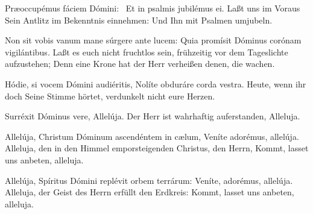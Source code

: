 \documentclass[fontsize=9pt,paper=A6,twoside,BCOR=1mm,DIV=22,headinclude]{scrarticle}
\begin{document}
\begin{paracol}{2}\pcb
	Præoccupémus fáciem Dómini:~\red{*} Et in psalmis jubilémus ei.
	\switchcolumn
	Laßt uns im Voraus Sein Antlitz im Bekenntnis einnehmen: \red{*} Und Ihn mit Psalmen umjubeln.
\end{paracol}

\begin{paracol}{2}\pcb
	Non sit vobis vanum mane súrgere ante lucem: \red{*} Quia promísit Dóminus corónam vigilántibus.
	\switchcolumn
	Laßt es euch nicht fruchtlos sein, frühzeitig vor dem Tageslichte aufzustehen; \red{*} Denn eine Krone hat der Herr verheißen denen, die wachen.
\end{paracol}

\begin{paracol}{2}\pcb
	Hódie, si vocem Dómini audiéritis, \red{*} Nolíte obduráre corda vestra.
	\switchcolumn 
	Heute, wenn ihr doch Seine Stimme hörtet, \red{*} verdunkelt nicht eure Herzen.
\end{paracol}
\vspace{.6em}

\begin{paracol}{2}\pcb
	Surréxit Dóminus vere, \red{*} Allelúja.
	\switchcolumn 
	Der Herr ist wahrhaftig auferstanden, \red{*} Alleluja.
\end{paracol}

\begin{paracol}{2}\pcb
	Allelúja, Christum Dóminum ascendéntem in cælum, \red{*} Veníte adorémus, allelúja.
	\switchcolumn 
	Alleluja, den in den Himmel emporsteigenden Christus, den Herrn, \red{*} Kommt, lasset uns anbeten, alleluja.
\end{paracol}

\begin{paracol}{2}\pcb
	Allelúja, Spíritus Dómini replévit orbem terrárum: \red{*} Veníte, adorémus, allelúja.
	\switchcolumn 
	Alleluja, der Geist des Herrn erfüllt den Erdkreis: \red{*} Kommt, lasset uns anbeten, alleluja.
\end{paracol}
\end{document}
